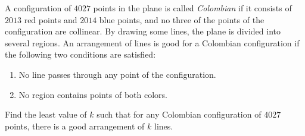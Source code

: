 A configuration of 
$4027$
points in the plane is called \emph{Colombian} if it consists of 
$2013$
 red points and 
$2014$
 blue points, and no three of the points of the configuration are collinear. By drawing some lines, the plane is divided into several regions. An arrangement of lines is good for a Colombian configuration if the following two conditions are satisfied:

\begin{enumerate}[label = (\alph*)]
	\item No line passes through any point of the configuration.
	\item No region contains points of both colors.
\end{enumerate}

Find the least value of 
$k$
 such that for any Colombian configuration of 
$4027$
 points, there is a good arrangement of 
$k$
 lines.
